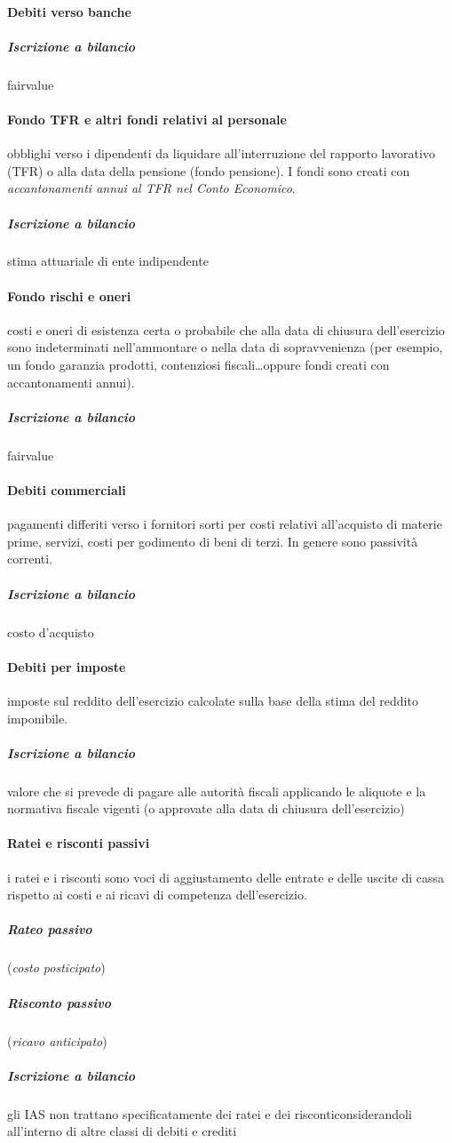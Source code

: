 \paragraph{Debiti verso banche}
\subparagraph{Iscrizione a bilancio} \gls{fairvalue}

\paragraph{Fondo TFR e altri fondi relativi al personale} obblighi verso i dipendenti
da liquidare all’interruzione del rapporto lavorativo (\gls{TFR}) o alla data della pensione
(fondo pensione). I fondi sono creati con \emph{accantonamenti annui al TFR nel Conto Economico}.
\subparagraph{Iscrizione a bilancio} stima attuariale di ente indipendente

\paragraph{Fondo rischi e oneri} costi e oneri di esistenza certa o probabile che
alla data di chiusura dell’esercizio sono indeterminati nell’ammontare o nella data
di sopravvenienza (per esempio, un fondo  garanzia prodotti, contenziosi fiscali\dots oppure
fondi creati con accantonamenti annui).
\subparagraph{Iscrizione a bilancio} \gls{fairvalue}

\paragraph{Debiti commerciali} pagamenti differiti verso i fornitori sorti per costi
relativi all’acquisto di materie prime, servizi, costi per godimento di beni di terzi.
In genere sono passività correnti.
\subparagraph{Iscrizione a bilancio} costo d'acquisto

\paragraph{Debiti per imposte} imposte sul reddito dell’esercizio calcolate sulla
base della stima del reddito imponibile.
\subparagraph{Iscrizione a bilancio} valore che si prevede di pagare alle autorità
fiscali applicando le aliquote e la normativa fiscale vigenti (o approvate alla
data di chiusura dell’esercizio)

\paragraph{Ratei e risconti passivi} i ratei e i risconti sono voci di aggiustamento
delle entrate e delle uscite di cassa rispetto ai costi e ai ricavi di competenza dell’esercizio.
\subparagraph{Rateo passivo} (\emph{costo posticipato})
\subparagraph{Risconto passivo} (\emph{ricavo anticipato})
\subparagraph{Iscrizione a bilancio} gli IAS non trattano specificatamente dei ratei
e dei risconticonsiderandoli all'interno di altre classi di debiti e crediti

